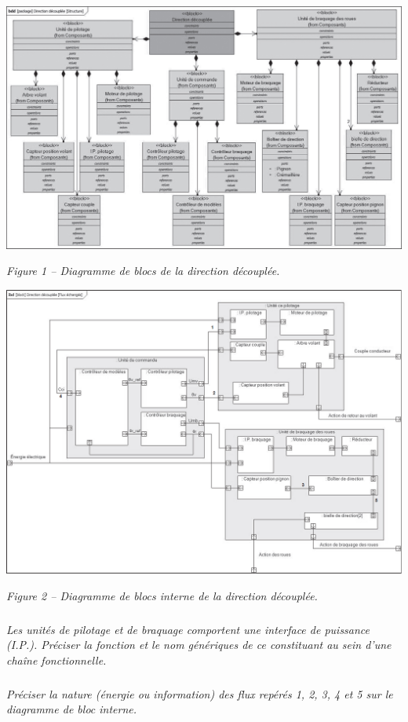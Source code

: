 \documentclass[10pt,fleqn]{article} %
\begin{document}
\begin{center}
\includegraphics[width=\linewidth]{images/fig_10}

\textit{Figure 1 -- Diagramme de blocs de la direction découplée.}
\end{center}
\begin{center}
\includegraphics[width=\linewidth]{images/fig_11}

\textit{Figure 2 -- Diagramme de blocs interne de la direction découplée.}
\end{center}

\subparagraph{}
\textit{Les unités de pilotage et de braquage comportent une interface de puissance (I.P.). Préciser la
fonction et le nom génériques de ce constituant au sein d'une chaîne fonctionnelle.}

\subparagraph{}
\textit{Préciser la nature (énergie ou information) des flux repérés 1, 2, 3, 4 et 5 sur le diagramme de bloc
interne.}
\ifprof
\begin{corrige}
\end{corrige}
\else
\fi
\end{document}
